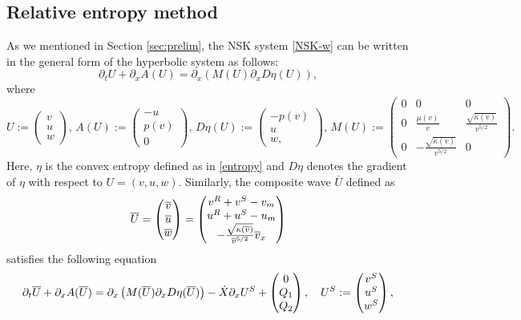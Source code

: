 \documentclass[11pt,reqno]{amsart}
\begin{document}
\subsection{Relative entropy method} As we mentioned in Section \ref{sec:prelim}, the NSK system \eqref{NSK-w} can be written in the general form of the hyperbolic system as follows:
\begin{equation}\label{eq:NS-abs}
\partial_t U +\partial_x A(U) = \partial_x (M(U) \partial_x D \eta (U)),
\end{equation}
where 
\[U:=\begin{pmatrix}
    v\\u\\w
\end{pmatrix},\, 
A(U):=\begin{pmatrix}
-u\\  p(v) \\0
\end{pmatrix},\, 
D\eta(U):=\begin{pmatrix}
-p(v)\\  u \\w,
\end{pmatrix},\, M(U):=
\begin{pmatrix}
0 &0 &0\\
0 &\frac{\mu(v)}{v}  &\frac{\sqrt{\kappa(v)}}{v^{5/2}}\\
0 &-\frac{\sqrt{\kappa(v)}}{v^{5/2}} &0
\end{pmatrix}.\]
Here, $\eta$ is the convex entropy defined as in \eqref{entropy} and $D\eta$ denotes the gradient of $\eta$ with respect to $U=(v,u,w)$. Similarly, the composite wave $\overline{U}$ defined as
\[\overline{U}=
\begin{pmatrix}
    \overline{v}\\\overline{u}\\\overline{w}
\end{pmatrix}=
\begin{pmatrix}
    v^R+v^S-v_m \\ u^R+u^S-u_m\\ -\frac{\sqrt{\kappa(\overline{v})}}{\overline{v}^{5/2}}\overline{v}_x
\end{pmatrix}\] 
satisfies the following equation
\begin{equation}\label{eq:composite_wave}
\partial_t\overline{U} +\partial_x A(\overline{U})=\partial_x \left(M(\overline{U}) \partial_x D \eta(\overline{U}) \right) -\dot{X} \partial_x U^S+ 
\begin{pmatrix}
0 \\ Q_1 \\ Q_2    
\end{pmatrix}
, \quad U^S:=\begin{pmatrix}
v^S\\u^S\\w^S
\end{pmatrix},
\end{equation}
\end{document}
